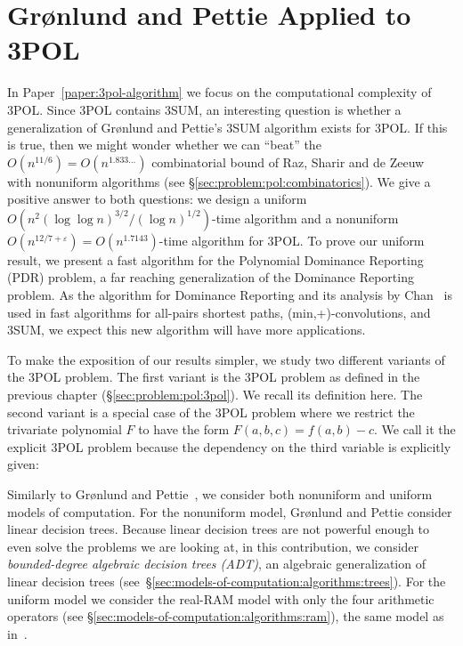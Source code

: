 \section{Gr\o nlund and Pettie Applied to 3POL}


In Paper~\ref{paper:3pol-algorithm}
we focus on the computational complexity of 3POL\@. Since 3POL contains 3SUM,
an interesting question is whether a generalization of Gr\o nlund and Pettie's
3SUM algorithm exists for 3POL\@. If this is true, then we might wonder whether
we can ``beat'' the $O(n^{11/6}) = O(n^{1.833\ldots})$ combinatorial bound of Raz,
Sharir and de Zeeuw~\cite{RSZ15} with nonuniform algorithms
(see \S\ref{sec:problem:pol:combinatorics}).
%
We give a positive
answer to both questions: we design
a uniform
$O(n^2 {(\log \log n)}^{3/2} / {(\log n)}^{1/2})$-time
algorithm
and
a nonuniform
$O(n^{12/7+\varepsilon}) = O(n^{1.7143})$-time algorithm
for 3POL\@.
%
To prove our uniform result, we present a fast algorithm for the Polynomial
Dominance Reporting (PDR) problem, a far reaching generalization of the
Dominance Reporting problem. As the algorithm for Dominance Reporting and its
analysis by Chan~\cite{Cha08} is used in fast algorithms for all-pairs shortest
paths, (min,+)-convolutions, and 3SUM, we expect this new algorithm will have
more applications.

To make the exposition of our results simpler,
we study two different variants of the 3POL problem.
The first variant is the 3POL problem as defined in the previous chapter
(\S\ref{sec:problem:pol:3pol}).
We recall its definition here.
\ProblemPOLImplicit*
The second variant is a special case of the 3POL problem where we
restrict the trivariate polynomial $F$ to have the form $F(a,b,c) = f(a,b) -
c$. We call it the explicit 3POL problem because the dependency on the third
variable is explicitly given:
%


Similarly to Gr\o nlund and Pettie~\cite{GP18}, we consider both nonuniform
and uniform models of computation.
%
For the nonuniform model, Gr\o nlund and Pettie consider linear
decision trees.
%
Because linear decision trees are not powerful enough to even solve the
problems we are looking at,
in this contribution, we consider
\emph{bounded-degree algebraic decision trees (ADT)},
an algebraic generalization of linear decision trees
(see~\S\ref{sec:models-of-computation:algorithms:trees}).
%
For the uniform model we consider the real-RAM model with only the four
arithmetic operators (see \S\ref{sec:models-of-computation:algorithms:ram}),
the same model as in~\cite{GP18}.

